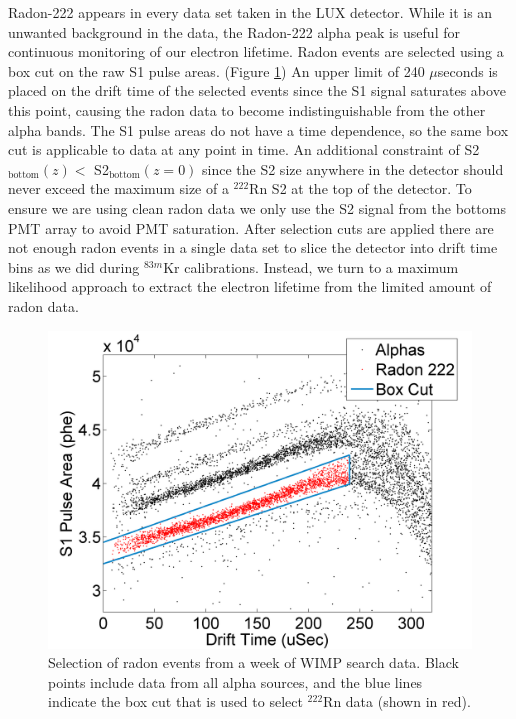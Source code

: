 \documentclass[a4paper,12pt]{article}
\begin{document}
{Radon-222 appears in every data set taken in the LUX detector.  While it is an unwanted background in the data, the Radon-222 alpha peak is useful for continuous monitoring of our electron lifetime.  Radon events are selected using a box cut on the raw S1 pulse areas. (Figure \ref{fig:RadonSelection}) An upper limit of 240 $\mu$seconds is placed on the drift time of the selected events since the S1 signal saturates above this point, causing the radon data to become indistinguishable from the other alpha bands.  The S1 pulse areas do not have a time dependence, so the same box cut is applicable to data at any point in time.  An additional constraint of S2$_{\mbox{bottom}}(z) <$ S2$_{\mbox{bottom}}(z=0)$  since the S2 size anywhere in the detector should never exceed the maximum size of a $^{222}$Rn S2 at the top of the detector.  To ensure we are using clean radon data we only use the S2 signal from the bottoms PMT array to avoid PMT saturation.  After selection cuts are applied there are not enough radon events in a single data set to slice the detector into drift time bins as we did during $^{83m}$Kr calibrations.  Instead, we turn to a maximum likelihood approach to extract the electron lifetime from the limited amount of radon data.


\begin{figure}[h]\centering
\includegraphics[scale=0.5]{RadonSelection.png}
\caption{Selection of radon events from a week of WIMP search data.  Black points include data from all alpha sources, and the blue lines indicate the box cut that is used to select $^{222}$Rn data (shown in red).}
\label{fig:RadonSelection}
\end{figure}

}
\end{document}
